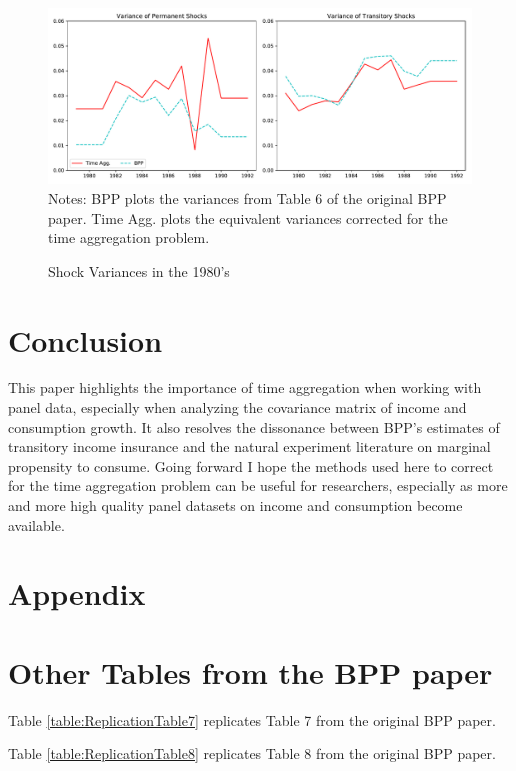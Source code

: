 \documentclass[titlepage]{\econtex}\newcommand{\texname}{BPP_TimeAgg}
\begin{document}


\begin{figure}
	\caption{Shock Variances in the 1980's}
	\label{figure:shockVariance}
	\includegraphics[width=1\textwidth]{../Code/Figures/ShockVariances1980s.pdf}
	\footnotesize Notes: BPP plots the variances from Table 6 of the original BPP paper. Time Agg. plots the equivalent variances corrected for the time aggregation problem.
\end{figure}

\section{Conclusion}
This paper highlights the importance of time aggregation when working with panel data, especially when analyzing the covariance matrix of income and consumption growth. It also resolves the dissonance between BPP's estimates of transitory income insurance and the natural experiment literature on marginal propensity to consume. Going forward I hope the methods used here to correct for the time aggregation problem can be useful for researchers, especially as more and more high quality panel datasets on income and consumption become available.

\processdelayedfloats

\small

\normalsize

\pagebreak
\appendix

\section*{Appendix}





\section{Other Tables from the BPP paper} \label{table_appendix}
Table \ref{table:ReplicationTable7} replicates Table 7 from the original BPP paper.

 

Table \ref{table:ReplicationTable8} replicates Table 8 from the original BPP paper.
\end{document}
